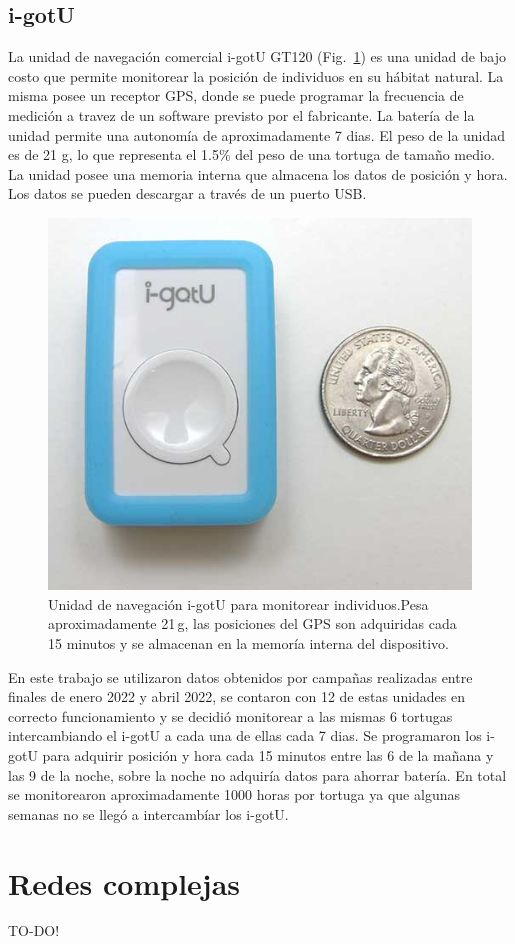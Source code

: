 \subsection{i-gotU}
La unidad de navegación comercial i-gotU GT120 (Fig.~\ref{fig:igotu}) es una unidad de bajo costo que permite monitorear la posición de individuos en su hábitat natural. La misma posee un receptor GPS, donde se puede programar la frecuencia de medición a travez de un software previsto por el fabricante. La batería de la unidad permite una autonomía de aproximadamente 7 dias. El peso de la unidad es de 21 g, lo que representa el 1.5\% del peso de una tortuga de tamaño medio. La unidad  posee una memoria interna que almacena los datos de posición y hora. Los datos se pueden descargar a través de un puerto USB.

\begin{figure}[ht]
    \begin{center}
        
    
    \includegraphics[width=.8\imsize]{figs/Chap1/igotu.jpg}  
\end{center}
    \caption[Unidad de navegación comercial i-gotU para monitorear individuos.] {Unidad de navegación i-gotU para monitorear individuos.Pesa aproximadamente  21\,g, las posiciones del GPS son adquiridas cada 15 minutos y se almacenan en la memoría interna del dispositivo. }
    \label{fig:igotu}
\end{figure}
En este trabajo se utilizaron datos obtenidos por campañas realizadas entre finales de enero 2022 y abril 2022, se contaron con 12 de estas unidades en correcto funcionamiento y se decidió monitorear a las mismas 6 tortugas intercambiando el i-gotU a cada una de ellas cada 7 dias. Se programaron los i-gotU para adquirir posición y hora cada 15 minutos entre las 6 de la mañana y las 9 de la noche, sobre la noche no adquiría datos para ahorrar batería. En total se monitorearon aproximadamente 1000 horas por tortuga ya que algunas semanas no se llegó a intercambíar los i-gotU.

\section{Redes complejas}
\begin{huge}
    TO-DO!
\end{huge}



